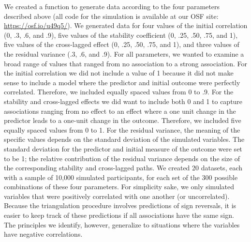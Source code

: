 \documentclass[
  man,floatsintext]{apa6}
\begin{document}
We created a function to generate data according to the four parameters described above (all code for the simulation is available at our OSF site: \url{https://osf.io/u49q5/}). We generated data for four values of the initial correlation (0, .3, .6, and .9), five values of the stability coefficient (0, .25, .50, .75, and 1), five values of the cross-lagged effect (0, .25, .50, .75, and 1), and three values of the residual variance (.3, .6, and .9). For all parameters, we wanted to examine a broad range of values that ranged from no association to a strong association. For the initial correlation we did not include a value of 1 because it did not make sense to include a model where the predictor and initial outcome were perfectly correlated. Therefore, we included equally spaced values from 0 to .9. For the stability and cross-lagged effects we did want to include both 0 and 1 to capture associations ranging from no effect to an effect where a one unit change in the predictor leads to a one-unit change in the outcome. Therefore, we included five equally spaced values from 0 to 1. For the residual variance, the meaning of the specific values depends on the standard deviation of the simulated variables. The standard deviation for the predictor and initial measure of the outcome were set to be 1; the relative contribution of the residual variance depends on the size of the corresponding stability and cross-lagged paths. We created 20 datasets, each with a sample of 10,000 simulated participants, for each set of the 300 possible combinations of these four parameters. For simplicity sake, we only simulated variables that were positively correlated with one another (or uncorrelated). Because the triangulation procedure involves predictions of sign reversals, it is easier to keep track of these predictions if all associations have the same sign. The principles we identify, however, generalize to situations where the variables have negative correlations.
\end{document}

